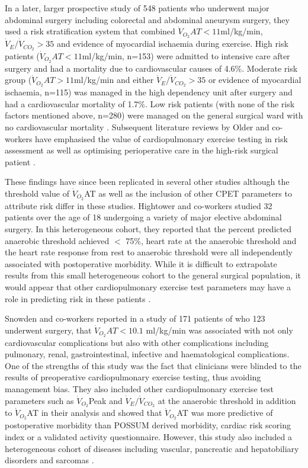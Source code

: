 In a later, larger prospective study of 548 patients who underwent major abdominal surgery including colorectal and abdominal aneurysm surgery, they used a risk stratification system that combined $\dot{V}_{O_2}AT<11$ml/kg/min, $\dot{V}_E/\dot{V}_{CO_2}>35$ and evidence of myocardial ischaemia during exercise. 
High risk patients ($\dot{V}_{O_2}AT<11$ml/kg/min, n=153) were admitted to intensive care after surgery and had a mortality due to cardiovascular causes of 4.6\%. 
Moderate risk group ($\dot{V}_{O_2}AT>11$ml/kg/min and either $\dot{V}_E/\dot{V}_{CO_2}>35$ or evidence of myocardial ischaemia, n=115) was managed in the high dependency unit after surgery and had a cardiovascular mortality of 1.7\%. 
Low risk patients (with none of the risk factors mentioned above, n=280) were managed on the general surgical ward with no cardiovascular mortality \parencite{older_cardiopulmonary_1999}. 
Subsequent literature reviews by Older and co-workers have emphasised the value of cardiopulmonary exercise testing in risk assessment as well as optimising perioperative care in the high-risk surgical patient \parencite{older_preoperative_2000, older_clinical_2004, older_preoperative_2005}. 

These findings have since been replicated in several other studies although the threshold value of $\dot{V}_{O_2}$AT as well as the inclusion of other CPET parameters to attribute risk differ in these studies. 
Hightower and co-workers studied 32 patients over the age of 18 undergoing a variety of major elective abdominal surgery. 
In this heterogeneous cohort, they reported that the percent predicted anaerobic threshold achieved $<$ 75\%, heart rate at the anaerobic threshold and the heart rate response from rest to anaerobic threshold were all independently associated with postoperative morbidity. 
While it is difficult to extrapolate results from this small heterogeneous cohort to the general surgical population, it would appear that other cardiopulmonary exercise test parameters may have a role in predicting risk in these patients \parencite{hightower_pilot_2010}. 

Snowden and co-workers reported in a study of 171 patients of who 123 underwent surgery, that $\dot{V}_{O_2}AT<10.1$ ml/kg/min was associated with not only cardiovascular complications but also with other complications including pulmonary, renal, gastrointestinal, infective and haematological complications. 
One of the strengths of this study was the fact that clinicians were blinded to the results of preoperative cardiopulmonary exercise testing, thus avoiding management bias. 
They also included other cardiopulmonary exercise test parameters such as $\dot{V}_{O_2}$Peak and $\dot{V}_E/\dot{V}_{CO_2}$ at the anaerobic threshold in addition to $\dot{V}_{O_2}$AT in their analysis and showed that $\dot{V}_{O_2}$AT was more predictive of postoperative morbidity than POSSUM derived morbidity, cardiac risk scoring index or a validated activity questionnaire. 
However, this study also included a heterogeneous cohort of diseases including vascular, pancreatic and hepatobiliary disorders and sarcomas \parencite{snowden_submaximal_2010}. 


